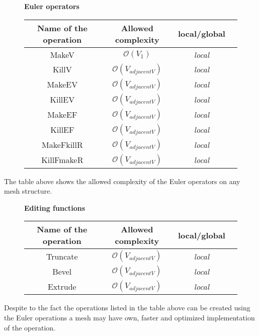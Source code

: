 \begin{figure}[!hbf]

\centering
\textbf{Euler operators}\\
\vspace{2mm}
\begin{tabular}{| c | c | c | c |}
\hline
\textbf{Name of the operation} & \textbf{Allowed complexity} & \textbf{local/global}\\
\hline
MakeV & $\mathcal{O}(V_{1})$ & \emph{local}\\
\hline
KillV & $\mathcal{O}(V_{adjacentV})$ & \emph{local}\\
\hline
MakeEV & $\mathcal{O}(V_{adjacentV})$ & \emph{local}\\
\hline
KillEV & $\mathcal{O}(V_{adjacentV})$ & \emph{local}\\
\hline
MakeEF & $\mathcal{O}(V_{adjacentV})$ & \emph{local}\\
\hline
KillEF & $\mathcal{O}(V_{adjacentV})$ & \emph{local}\\
\hline
MakeFkillR & $\mathcal{O}(V_{adjacentV})$ & \emph{local}\\
\hline
KillFmakeR & $\mathcal{O}(V_{adjacentV})$ & \emph{local}\\
\hline
\end{tabular}
\end{figure}
The table above shows the allowed complexity of the Euler operators on any mesh structure.

\begin{figure}[!hbf]

\centering
\textbf{Editing functions}\\
\vspace{2mm}
\begin{tabular}{| c | c | c | c |}
\hline
\textbf{Name of the operation} & \textbf{Allowed complexity} & \textbf{local/global}\\
\hline
Truncate & $\mathcal{O}(V_{adjacentV})$ & \emph{local}\\
\hline
Bevel & $\mathcal{O}(V_{adjacentV})$ & \emph{local}\\
\hline
Extrude & $\mathcal{O}(V_{adjacentV})$ & \emph{local}\\
\hline
\end{tabular}
\end{figure}
Despite to the fact the operations listed in the table above can be created using the
Euler operations a mesh may have own, faster and optimized implementation of the operation.

